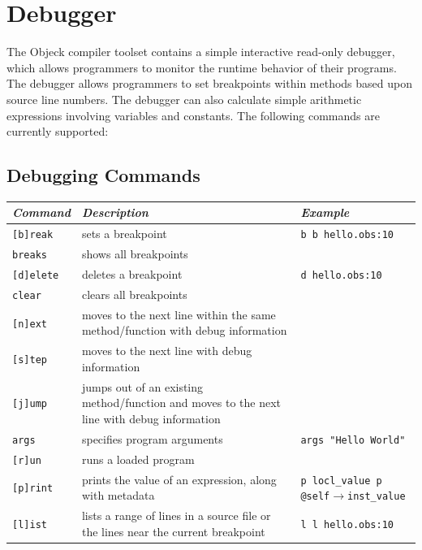 \documentclass[11pt]{article}
\begin{document}
\section{Debugger}
The Objeck compiler toolset contains a simple interactive read-only
debugger, which allows programmers to monitor the runtime behavior of
their programs.  The debugger allows programmers to set breakpoints
within methods based upon source line numbers.  The debugger can also
calculate simple arithmetic expressions involving variables and
constants. The following commands are currently supported:


\subsection{Debugging Commands}
\begin{center}
  \begin{tabular}{| l |p{4 cm} |p{4 cm} |}
    \hline
    \emph{Command} & \emph{Description} & \emph{Example} \\ \hline \hline
    \texttt{[b]reak} &  sets a breakpoint & \texttt{b \newline b hello.obs:10} \\ \hline
    \texttt{breaks} &  shows all breakpoints &  \\ \hline
    \texttt{[d]elete} &  deletes a breakpoint & \texttt{d hello.obs:10} \\ \hline
    \texttt{clear} &  clears all breakpoints &  \\ \hline
    \texttt{[n]ext} &  moves to the next line within the same
    method/function with debug information & \\ \hline
    \texttt{[s]tep} &  moves to the next line with debug information &  \\ \hline
    \texttt{[j]ump} &  jumps out of an existing method/function and moves to the next line with debug information &  \\ \hline
    \texttt{args} &  specifies program arguments & \texttt{args "Hello World"} \\ \hline
    \texttt{[r]un} &  runs a loaded program &  \\ \hline
    \texttt{[p]rint} &  prints the value of an expression, along with
    metadata & \texttt{p locl\_value \newline p @self$\rightarrow$inst\_value} \\ \hline
    \texttt{[l]ist} &  lists a range of lines in a source file or the
    lines near the current breakpoint & \texttt{l \newline l hello.obs:10} \\ \hline

\end{tabular}
\end{center}
\end{document}
